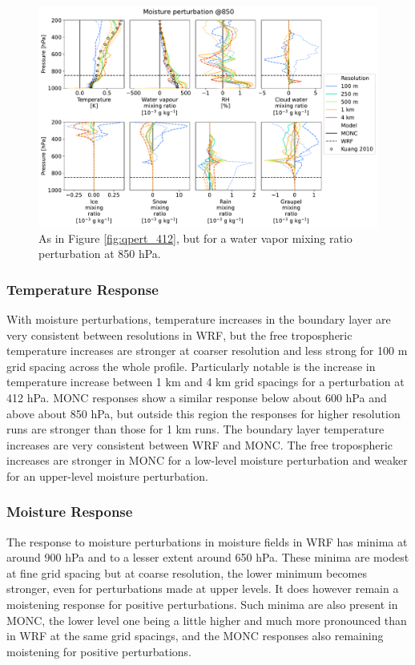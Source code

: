 \documentclass[draft]{agujournal2019}
\begin{document}
\begin{figure}[pth]
    \noindent\includegraphics[width=\textwidth]{figures/pert_diffs_q_0.0002_@850}
    \caption{As in Figure \ref{fig:qpert_412}, but for a water vapor mixing
    ratio perturbation at 850 hPa.}
    \label{fig:qpert_850}
\end{figure}

\subsubsection{Temperature Response}

With moisture perturbations, temperature increases in the boundary layer are
very consistent between resolutions in WRF, but the free tropospheric
temperature increases are stronger at coarser resolution and less strong for 100
m grid spacing across the whole profile. Particularly notable is the increase in
temperature increase between 1 km and 4 km grid spacings for a perturbation at
412 hPa. MONC responses show a similar response below about 600 hPa and above
about 850 hPa, but outside this region the responses for higher resolution runs
are stronger than those for 1 km runs. The boundary layer temperature increases
are very consistent between WRF and MONC. The free tropospheric increases are
stronger in MONC for a low-level moisture perturbation and weaker for an
upper-level moisture perturbation.

\subsubsection{Moisture Response}

The response to moisture perturbations in moisture fields in WRF has minima at
around 900 hPa and to a lesser extent around 650 hPa. These minima are modest at
fine grid spacing but at coarse resolution, the lower minimum becomes stronger,
even for perturbations made at upper levels. It does however remain a moistening
response for positive perturbations. Such minima are also present in MONC, the
lower level one being a little higher and much more pronounced than in WRF at
the same grid spacings, and the MONC responses also remaining moistening for
positive perturbations.
\end{document}
